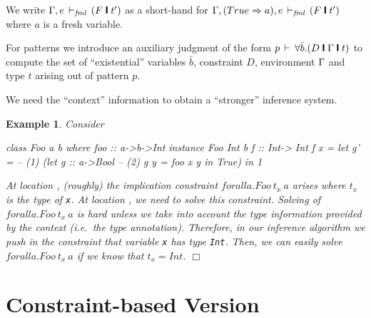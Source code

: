 \documentclass{article}
\newtheorem{ex}{Example}
\newenvironment{example}{
        \begin{ex}\rm}%
        {\hfill$\Box$\end{ex}}
\newcommand{\gd}[0]{~\rule{0.5mm}{2.5mm}~}
\begin{document}
We write $\tenv, e \trl (F \gd t')$ as a short-hand for
$\tenv, (True \Rightarrow a), e \trl (F \gd t')$ where $a$ is a fresh variable.


For patterns we introduce an auxiliary
judgment of the form $p \turns \forall \bar{b}.(D \gd \tenv \gd t)$ 
to compute the set of ``existential'' 
variables $\bar{b}$,
constraint $D$, environment $\Gamma$ and type $t$ arising out of pattern $p$. 

We need the ``context'' information to obtain a ``stronger'' inference system.  

\begin{example}
Consider
\begin{code}
class Foo a b where foo :: a->b->Int
instance Foo Int b
f :: Int-> Int
f x = let g' = -- (1)
               (let g :: a->Bool   -- (2)
                    g y = foo x y
                in True)
      in 1
\end{code}
%
At location , (roughly) the implication constraint
$forall a.Foo~t_x~a$ arises where $t_x$ is the type of {\tt x}.
At location , we need to solve this constraint.
Solving of $forall a.Foo~t_x~a$ is hard unless we take into account
the type information provided by the context (i.e.~the type annotation).
Therefore, in our inference algorithm we push in the constraint that variable {\tt x} has
type {\tt Int}. Then, we can easily solve $forall a.Foo~t_x~a$ if we know
that $t_x=Int$.
\end{example}


\section{Constraint-based Version}
\end{document}
